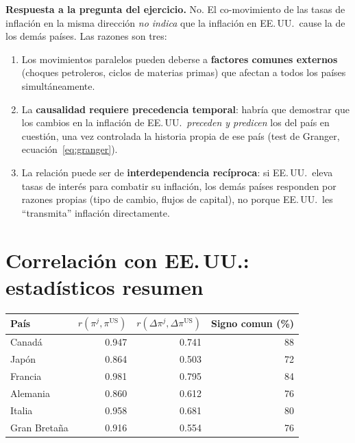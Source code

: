 \documentclass[12pt, letterpaper]{article}
\theoremstyle{remark}
\begin{document}
\begin{clave}
  \textbf{Respuesta a la pregunta del ejercicio.}\quad
  No. El co-movimiento de las tasas de inflaci\'on en la misma direcci\'on
  \emph{no indica} que la inflaci\'on en EE.\,UU.\ cause la de los dem\'as
  pa\'ises. Las razones son tres:

  \begin{enumerate}[leftmargin=1.4em, itemsep=4pt]
    \item Los movimientos paralelos pueden deberse a \textbf{factores
      comunes externos} (choques petroleros, ciclos de materias primas)
      que afectan a todos los pa\'ises simult\'aneamente.
    \item La \textbf{causalidad requiere precedencia temporal}: habr\'ia
      que demostrar que los cambios en la inflaci\'on de EE.\,UU.\
      \emph{preceden y predicen} los del pa\'is en cuesti\'on, una vez
      controlada la historia propia de ese pa\'is (test de Granger,
      ecuaci\'on~\ref{eq:granger}).
    \item La relaci\'on puede ser de \textbf{interdependencia rec\'iproca}:
      si EE.\,UU.\ eleva tasas de inter\'es para combatir su inflaci\'on,
      los dem\'as pa\'ises responden por razones propias (tipo de cambio,
      flujos de capital), no porque EE.\,UU.\ les ``transmita'' inflaci\'on
      directamente.
  \end{enumerate}
\end{clave}

\appendix

\section{Correlaci\'on con EE.\,UU.: estad\'isticos resumen}

\begin{center}
\begin{tabular}{lrrr}
\toprule
\textbf{Pa\'is} & $r(\pi^j, \pi^{\text{US}})$ & $r(\Delta\pi^j, \Delta\pi^{\text{US}})$
  & \textbf{Signo comun (\%)} \\
\midrule
Canad\'a    & 0.947 & 0.741 & 88 \\
Jap\'on     & 0.864 & 0.503 & 72 \\
Francia     & 0.981 & 0.795 & 84 \\
Alemania    & 0.860 & 0.612 & 76 \\
Italia      & 0.958 & 0.681 & 80 \\
Gran Breta\~na & 0.916 & 0.554 & 76 \\
\bottomrule
\end{tabular}
\end{center}
\end{document}
